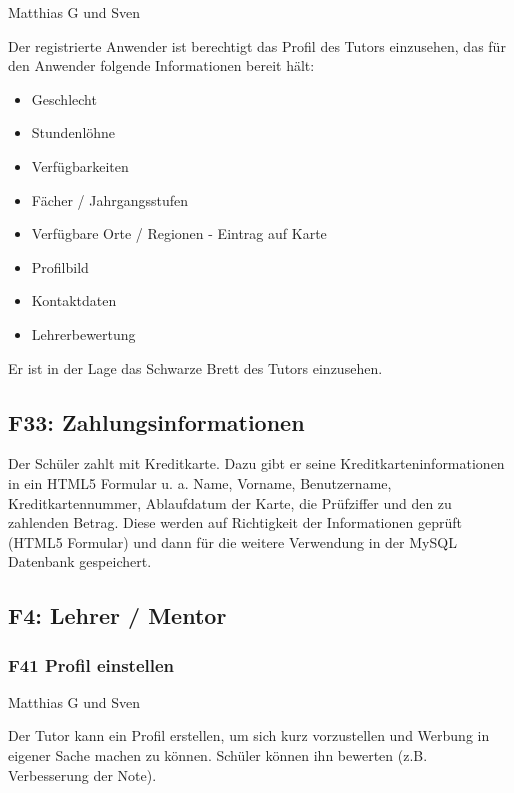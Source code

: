 \documentclass[10pt,a4paper]{scrartcl}
\begin{document}
Matthias G und Sven

Der registrierte Anwender ist berechtigt das Profil des Tutors einzusehen, das für den Anwender folgende Informationen bereit hält:

\begin{itemize}
	\item Geschlecht
	\item Stundenlöhne 
	\item Verfügbarkeiten 
	\item Fächer / Jahrgangsstufen 
	\item Verfügbare Orte / Regionen - Eintrag auf Karte
	\item Profilbild
	\item Kontaktdaten
	\item Lehrerbewertung
\end{itemize}
	
Er ist in der Lage das Schwarze Brett des Tutors einzusehen.

\subsection*{F33: Zahlungsinformationen}

Der Schüler zahlt mit Kreditkarte. Dazu gibt er seine Kreditkarteninformationen in ein HTML5 Formular u. a. Name, Vorname, Benutzername, Kreditkartennummer, Ablaufdatum der Karte, die Prüfziffer und den zu zahlenden Betrag. Diese werden auf Richtigkeit der Informationen geprüft (HTML5 Formular) und dann für die weitere Verwendung in der MySQL Datenbank gespeichert. 

\subsection{F4: Lehrer / Mentor}
\subsubsection*{F41 Profil einstellen}

Matthias G und Sven

Der Tutor kann ein Profil erstellen, um sich kurz vorzustellen und Werbung in eigener Sache machen zu können. Schüler können ihn bewerten (z.B. Verbesserung der Note).
\end{document}
